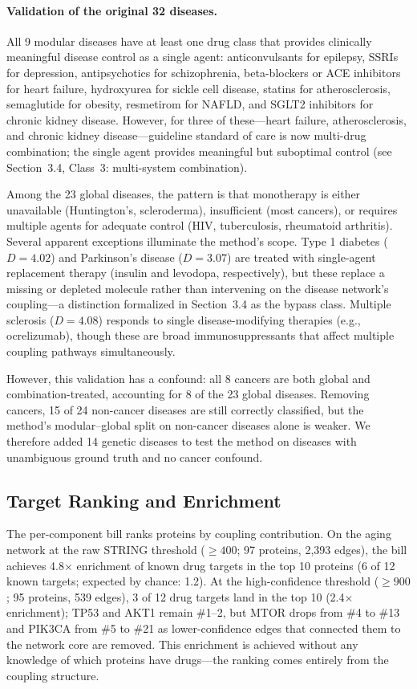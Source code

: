 \documentclass[11pt,a4paper]{article}
\begin{document}
\paragraph{Validation of the original 32 diseases.} All 9 modular diseases have at least one drug class that provides clinically meaningful disease control as a single agent: anticonvulsants for epilepsy, SSRIs for depression, antipsychotics for schizophrenia, beta-blockers or ACE inhibitors for heart failure, hydroxyurea for sickle cell disease, statins for atherosclerosis, semaglutide for obesity, resmetirom for NAFLD, and SGLT2 inhibitors for chronic kidney disease. However, for three of these---heart failure, atherosclerosis, and chronic kidney disease---guideline standard of care is now multi-drug combination; the single agent provides meaningful but suboptimal control (see Section~3.4, Class~3: multi-system combination).

Among the 23 global diseases, the pattern is that monotherapy is either unavailable (Huntington's, scleroderma), insufficient (most cancers), or requires multiple agents for adequate control (HIV, tuberculosis, rheumatoid arthritis). Several apparent exceptions illuminate the method's scope. Type 1 diabetes ($D = 4.02$) and Parkinson's disease ($D = 3.07$) are treated with single-agent replacement therapy (insulin and levodopa, respectively), but these replace a missing or depleted molecule rather than intervening on the disease network's coupling---a distinction formalized in Section~3.4 as the bypass class. Multiple sclerosis ($D = 4.08$) responds to single disease-modifying therapies (e.g., ocrelizumab), though these are broad immunosuppressants that affect multiple coupling pathways simultaneously.

However, this validation has a confound: all 8 cancers are both global and combination-treated, accounting for 8 of the 23 global diseases. Removing cancers, 15 of 24 non-cancer diseases are still correctly classified, but the method's modular--global split on non-cancer diseases alone is weaker. We therefore added 14 genetic diseases to test the method on diseases with unambiguous ground truth and no cancer confound.

\subsection{Target Ranking and Enrichment}

The per-component bill ranks proteins by coupling contribution. On the aging network at the raw STRING threshold ($\geq 400$; 97 proteins, 2{,}393 edges), the bill achieves 4.8$\times$ enrichment of known drug targets in the top 10 proteins (6 of 12 known targets; expected by chance: 1.2). At the high-confidence threshold ($\geq 900$; 95 proteins, 539 edges), 3 of 12 drug targets land in the top 10 (2.4$\times$ enrichment); TP53 and AKT1 remain \#1--2, but MTOR drops from \#4 to \#13 and PIK3CA from \#5 to \#21 as lower-confidence edges that connected them to the network core are removed. This enrichment is achieved without any knowledge of which proteins have drugs---the ranking comes entirely from the coupling structure.
\end{document}
